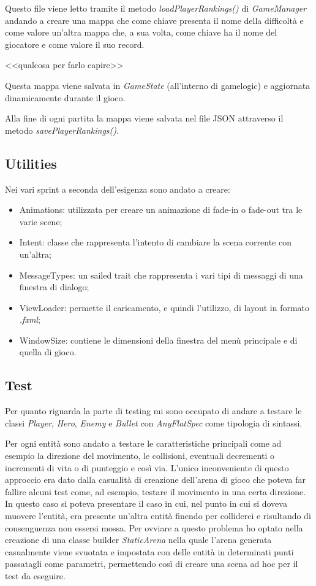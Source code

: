 Questo file viene letto tramite il metodo \textit{loadPlayerRankings()} di \textit{GameManager} andando a creare una mappa che come chiave presenta il nome della difficoltà e come valore un'altra mappa che, a sua volta, come chiave ha il nome del giocatore e come valore il suo record.

<<qualcosa per farlo capire>>

Questa mappa viene salvata in \textit{GameState} (all'interno di gamelogic) e aggiornata dinamicamente durante il gioco.

Alla fine di ogni partita la mappa viene salvata nel file JSON attraverso il metodo \textit{savePlayerRankings()}.

\subsection{Utilities}
Nei vari sprint a seconda dell'esigenza sono andato a creare:
\begin{itemize}
	\item Animations: utilizzata per creare un animazione di fade-in o fade-out tra le varie scene;
	\item Intent: classe che rappresenta l'intento di cambiare la scena corrente con un'altra;
	\item MessageTypes: un sailed trait che rappresenta i vari tipi di messaggi di una finestra di dialogo;
	\item ViewLoader: permette il caricamento, e quindi l'utilizzo, di layout in formato \textit{.fxml};
	\item WindowSize: contiene le dimensioni della finestra del menù principale e di quella di gioco.
		
\end{itemize}

\subsection{Test}
Per quanto riguarda la parte di testing mi sono occupato di andare a testare le classi \textit{Player}, \textit{Hero}, \textit{Enemy} e \textit{Bullet} con \textit{AnyFlatSpec} come tipologia di sintassi.

Per ogni entità sono andato a testare le caratteristiche principali come ad esempio la direzione del movimento, le collisioni, eventuali decrementi o incrementi di vita o di punteggio e così via.
L'unico inconveniente di questo approccio era dato dalla casualità di creazione dell'arena di gioco che poteva far fallire alcuni test come, ad esempio, testare il movimento in una certa direzione.
In questo caso si poteva presentare il caso in cui, nel punto in cui si doveva muovere l'entità, era presente un'altra entità finendo per colliderci e risultando di consenguenza non essersi mossa.
Per ovviare a questo problema ho optato nella creazione di una classe builder \textit{StaticArena} nella quale l'arena generata casualmente viene svuotata e impostata con delle entità in determinati punti passatagli come parametri, permettendo così di creare una scena ad hoc per il test da eseguire.

